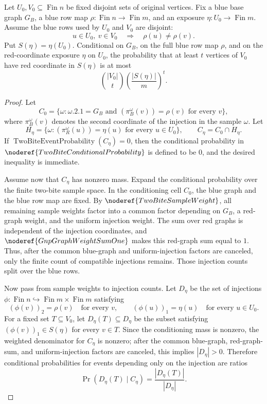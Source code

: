 \begin{lemma}
Let \(U_0,V_0\subseteq\operatorname{Fin}n\) be fixed disjoint sets of
original vertices.  Fix a blue base graph \(G_B\), a blue row map
\(\rho:\operatorname{Fin}n\to\operatorname{Fin}m\), and an exposure
\(\eta:U_0\to\operatorname{Fin}m\).  Assume the blue rows used by \(U_0\) and
\(V_0\) are disjoint:
\[
u\in U_0,\ v\in V_0 \quad\Longrightarrow\quad \rho(u)\ne\rho(v).
\]
Put \(S(\eta)=\eta(U_0)\).  Conditional on \(G_B\), on the full blue row map
\(\rho\), and on the red-coordinate exposure \(\eta\) on \(U_0\), the
probability that at least \(t\) vertices of \(V_0\) have red coordinate in
\(S(\eta)\) is at most
\[
\binom{|V_0|}{t}\left(\frac{|S(\eta)|}{m}\right)^t .
\]
\end{lemma}
\begin{proof}
Let
\[
C_0=\{\omega:\omega.2.1=G_B\text{ and }(\pi_B^\omega(v))=\rho(v)
\text{ for every }v\},
\]
where \(\pi_B^\omega(v)\) denotes the second coordinate of the injection in
the sample \(\omega\).  Let
\[
H_\eta=\{\omega:(\pi_R^\omega(u))=\eta(u)\text{ for every }u\in U_0\},
\qquad C_\eta=C_0\cap H_\eta .
\]
If \(\operatorname{TwoBiteEventProbability}(C_\eta)=0\), then the conditional
probability in \(\noderef{TwoBiteConditionalProbability}\) is defined to be
\(0\), and the desired inequality is immediate.

Assume now that \(C_\eta\) has nonzero mass.  Expand the conditional
probability over the finite two-bite sample space.  In the conditioning cell
\(C_0\), the blue graph and the blue row map are fixed.  By
\(\noderef{TwoBiteSampleWeight}\), all remaining sample weights factor into a
common factor depending on \(G_B\), a red-graph weight, and the uniform
injection weight.  The sum over red graphs is independent of the injection
coordinates, and \(\noderef{GnpGraphWeightSumOne}\) makes this red-graph
sum equal to \(1\).  Thus, after the common blue-graph and
uniform-injection factors are canceled, only the finite count of compatible
injections remains.  Those injection counts split over the blue rows.

Now pass from sample weights to injection counts.  Let \(D_\eta\) be the set
of injections \(\phi:\operatorname{Fin}n\hookrightarrow
\operatorname{Fin}m\times\operatorname{Fin}m\) satisfying
\[
(\phi(v))_2=\rho(v)\quad\text{for every }v,
\qquad
(\phi(u))_1=\eta(u)\quad\text{for every }u\in U_0.
\]
For a fixed set \(T\subseteq V_0\), let \(D_\eta(T)\subseteq D_\eta\) be the
subset satisfying \((\phi(v))_1\in S(\eta)\) for every \(v\in T\).  Since the
conditioning mass is nonzero, the weighted denominator for \(C_\eta\) is
nonzero; after the common blue-graph, red-graph-sum, and uniform-injection
factors are canceled, this implies \(|D_\eta|>0\).  Therefore conditional
probabilities for events depending only on the injection are ratios
\[
\Pr(D_\eta(T)\mid C_\eta)=\frac{|D_\eta(T)|}{|D_\eta|}.
\]


\end{proof}
